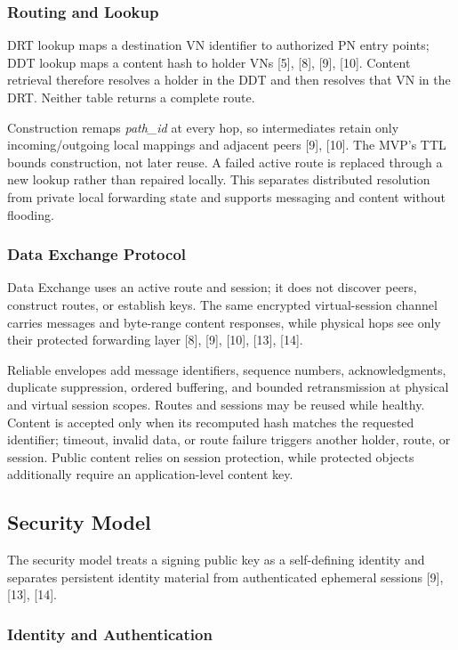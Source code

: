 \documentclass[12pt]{article}
\begin{document}
\subsubsection{Routing and Lookup}

DRT lookup maps a destination VN identifier to authorized PN entry points; DDT lookup maps a content hash to holder VNs [5], [8], [9], [10]. Content retrieval therefore resolves a holder in the DDT and then resolves that VN in the DRT. Neither table returns a complete route.

Construction remaps \textit{path\_id} at every hop, so intermediates retain only incoming/outgoing local mappings and adjacent peers [9], [10]. The MVP's TTL bounds construction, not later reuse. A failed active route is replaced through a new lookup rather than repaired locally. This separates distributed resolution from private local forwarding state and supports messaging and content without flooding.

\subsubsection{Data Exchange Protocol}

Data Exchange uses an active route and session; it does not discover peers, construct routes, or establish keys. The same encrypted virtual-session channel carries messages and byte-range content responses, while physical hops see only their protected forwarding layer [8], [9], [10], [13], [14].

Reliable envelopes add message identifiers, sequence numbers, acknowledgments, duplicate suppression, ordered buffering, and bounded retransmission at physical and virtual session scopes. Routes and sessions may be reused while healthy. Content is accepted only when its recomputed hash matches the requested identifier; timeout, invalid data, or route failure triggers another holder, route, or session. Public content relies on session protection, while protected objects additionally require an application-level content key.

\subsection{Security Model}

The security model treats a signing public key as a self-defining identity and separates persistent identity material from authenticated ephemeral sessions [9], [13], [14].

\subsubsection{Identity and Authentication}
\end{document}
